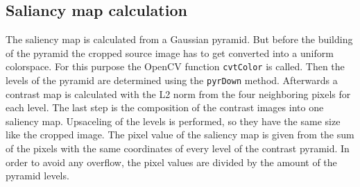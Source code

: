 \documentclass[draft,final]{vutinfth} %
\begin{document}
	\subsection{Saliancy map calculation}
	The saliency map is calculated from a Gaussian pyramid.
	But before the building of the pyramid the cropped source image has to get converted into a uniform colorspace.
	For this purpose the OpenCV function \texttt{cvtColor} is called.
	Then the levels of the pyramid are determined using the \texttt{pyrDown} method.
	Afterwards a contrast map is calculated with the L2 norm from the four neighboring pixels for each level.
	The last step is the composition of the contrast images into one saliency map.
	Upsaceling of the levels is performed, so they have the same size like the cropped image.
	The pixel value of the saliency map is given from the sum of the pixels with the same coordinates of every level of the contrast pyramid. 
	In order to avoid any overflow, the pixel values are divided by the amount of the pyramid levels.
	
\end{document}
